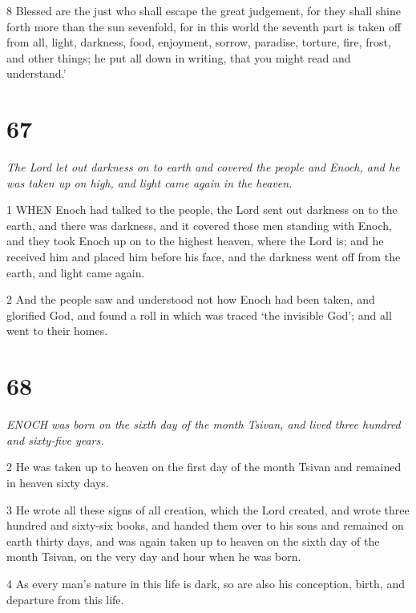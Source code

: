 \par 8 Blessed are the just who shall escape the great judgement, for they shall shine forth more than the sun sevenfold, for in this world the seventh part is taken off from all, light, darkness, food, enjoyment, sorrow, paradise, torture, fire, frost, and other things; he put all down in writing, that you might read and understand.'

\chapter{67}

\par \textit{The Lord let out darkness on to earth and covered the people and Enoch, and he was taken up on high, and light came again in the heaven.}

\par 1 WHEN Enoch had talked to the people, the Lord sent out darkness on to the earth, and there was darkness, and it covered those men standing with Enoch, and they took Enoch up on to the highest heaven, where the Lord is; and he received him and placed him before his face, and the darkness went off from the earth, and light came again.

\par 2 And the people saw and understood not how Enoch had been taken, and glorified God, and found a roll in which was traced ‘the invisible God’; and all went to their homes.

\chapter{68}

\par \textit{ENOCH was born on the sixth day of the month Tsivan, and lived three hundred and sixty-five years.}

\par 2 He was taken up to heaven on the first day of the month Tsivan and remained in heaven sixty days.

\par 3 He wrote all these signs of all creation, which the Lord created, and wrote three hundred and sixty-six books, and handed them over to his sons and remained on earth thirty days, and was again taken up to heaven on the sixth day of the month Tsivan, on the very day and hour when he was born.

\par 4 As every man's nature in this life is dark, so are also his conception, birth, and departure from this life.

